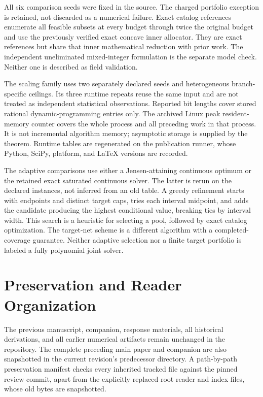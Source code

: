 All six comparison seeds were fixed in the source. The charged portfolio exception is retained, not discarded as a numerical failure. Exact catalog references enumerate all feasible subsets at every budget through twice the original budget and use the previously verified exact concave inner allocator. They are exact references but share that inner mathematical reduction with prior work. The independent uneliminated mixed-integer formulation is the separate model check. Neither one is described as field validation.

The scaling family uses two separately declared seeds and heterogeneous branch-specific ceilings. Its three runtime repeats reuse the same input and are not treated as independent statistical observations. Reported bit lengths cover stored rational dynamic-programming entries only. The archived Linux peak resident-memory counter covers the whole process and all preceding work in that process. It is not incremental algorithm memory; asymptotic storage is supplied by the theorem. Runtime tables are regenerated on the publication runner, whose Python, SciPy, platform, and LaTeX versions are recorded.

The adaptive comparisons use either a Jensen-attaining continuous optimum or the retained exact saturated continuous solver. The latter is rerun on the declared instances, not inferred from an old table. A greedy refinement starts with endpoints and distinct target caps, tries each interval midpoint, and adds the candidate producing the highest conditional value, breaking ties by interval width. This search is a heuristic for selecting a pool, followed by exact catalog optimization. The target-net scheme is a different algorithm with a completed-coverage guarantee. Neither adaptive selection nor a finite target portfolio is labeled a fully polynomial joint solver.

\section{Preservation and Reader Organization}\label{ec:r45-preservation}
The previous manuscript, companion, response materials, all historical derivations, and all earlier numerical artifacts remain unchanged in the repository. The complete preceding main paper and companion are also snapshotted in the current revision's predecessor directory. A path-by-path preservation manifest checks every inherited tracked file against the pinned review commit, apart from the explicitly replaced root reader and index files, whose old bytes are snapshotted.


